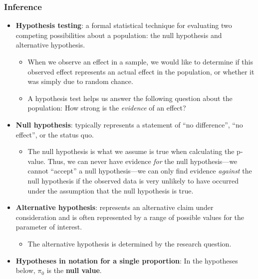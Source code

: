 \documentclass[
]{report}
\providecommand{\tightlist}{%
  \setlength{\itemsep}{0pt}\setlength{\parskip}{0pt}}
\begin{document}
\newpage

\subsubsection*{Inference}\label{inference-1}

\begin{itemize}
\item
  \textbf{Hypothesis testing}: a formal statistical technique for evaluating two competing possibilities about a population: the null hypothesis and alternative hypothesis.

  \begin{itemize}
  \item
    When we observe an effect in a sample, we would like to determine if this observed effect represents an actual effect in the population, or whether it was simply due to random chance.
  \item
    A hypothesis test helps us answer the following question about the population: How strong is the \emph{evidence} of an effect?
  \end{itemize}
\item
  \textbf{Null hypothesis}: typically represents a statement of ``no difference'', ``no effect'', or the status quo.

  \begin{itemize}
  \tightlist
  \item
    The null hypothesis is what we assume is true when calculating the p-value. Thus, we can never have evidence \emph{for} the null hypothesis---we cannot ``accept'' a null hypothesis---we can only find evidence \emph{against} the null hypothesis if the observed data is very unlikely to have occurred under the assumption that the null hypothesis is true.
  \end{itemize}
\item
  \textbf{Alternative hypothesis}: represents an alternative claim under consideration and is often represented by a range of possible values for the parameter of interest.

  \begin{itemize}
  \tightlist
  \item
    The alternative hypothesis is determined by the research question.
  \end{itemize}
\item
  \textbf{Hypotheses in notation for a single proportion}: In the hypotheses below, \(\pi_0\) is the \textbf{null value}.
\end{itemize}
\end{document}
